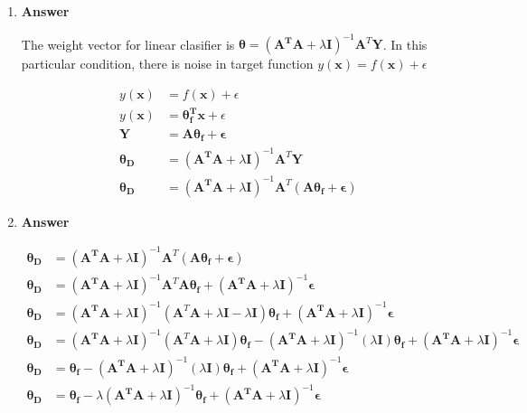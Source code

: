 \documentclass[11pt]{article}
\begin{document}
\begin{enumerate}[label=(\alph*)]


\item  \textbf{Answer}

The weight vector for linear clasifier is $\mathbf{\theta} = (\mathbf{A^T}\mathbf{A}+\lambda \mathbf{I})^{-1}\mathbf{A}^T\mathbf{Y}$. In this particular condition, there is noise in target function $y(\mathbf{x}) = f(\mathbf{x}) + \epsilon$

\begin{align*}
y(\mathbf{x}) &= f(\mathbf{x}) + \epsilon\\
y(\mathbf{x}) &= \mathbf{\theta_f^T}\mathbf{x} + \epsilon\\
\mathbf{Y} &= \mathbf{A}\mathbf{\theta_f} + \mathbf{\epsilon}\\
\mathbf{\theta_D} &= (\mathbf{A^T}\mathbf{A}+\lambda \mathbf{I})^{-1}\mathbf{A}^T\mathbf{Y}\\
\mathbf{\theta_D} &= (\mathbf{A^T}\mathbf{A}+\lambda \mathbf{I})^{-1}\mathbf{A}^T(\mathbf{A}\mathbf{\theta_f} + \mathbf{\epsilon})
\end{align*}



\item  \textbf{Answer}

\begin{align*}
\mathbf{\theta_D} &= (\mathbf{A^T}\mathbf{A}+\lambda \mathbf{I})^{-1}\mathbf{A}^T(\mathbf{A}\mathbf{\theta_f} + \mathbf{\epsilon})\\
\mathbf{\theta_D} &= (\mathbf{A^T}\mathbf{A}+\lambda \mathbf{I})^{-1}\mathbf{A}^T\mathbf{A}\mathbf{\theta_f} + (\mathbf{A^T}\mathbf{A}+\lambda \mathbf{I})^{-1} \mathbf{\epsilon}\\
\mathbf{\theta_D} &= (\mathbf{A^T}\mathbf{A}+\lambda \mathbf{I})^{-1}(\mathbf{A}^T\mathbf{A}+\lambda \mathbf{I}-\lambda \mathbf{I})\mathbf{\theta_f} + (\mathbf{A^T}\mathbf{A}+\lambda \mathbf{I})^{-1} \mathbf{\epsilon}\\
\mathbf{\theta_D} &= (\mathbf{A^T}\mathbf{A}+\lambda \mathbf{I})^{-1}(\mathbf{A}^T\mathbf{A}+\lambda \mathbf{I})\mathbf{\theta_f}-(\mathbf{A^T}\mathbf{A}+\lambda \mathbf{I})^{-1}(\lambda \mathbf{I})\mathbf{\theta_f} + (\mathbf{A^T}\mathbf{A}+\lambda \mathbf{I})^{-1} \mathbf{\epsilon}\\
\mathbf{\theta_D} &= \mathbf{\theta_f}-(\mathbf{A^T}\mathbf{A}+\lambda \mathbf{I})^{-1}(\lambda \mathbf{I})\mathbf{\theta_f} + (\mathbf{A^T}\mathbf{A}+\lambda \mathbf{I})^{-1} \mathbf{\epsilon}\\
\mathbf{\theta_D} &= \mathbf{\theta_f}- \lambda(\mathbf{A^T}\mathbf{A}+\lambda \mathbf{I})^{-1}\mathbf{\theta_f} + (\mathbf{A^T}\mathbf{A}+\lambda \mathbf{I})^{-1} \mathbf{\epsilon}\\
\end{align*}


\end{enumerate}
\end{document}

